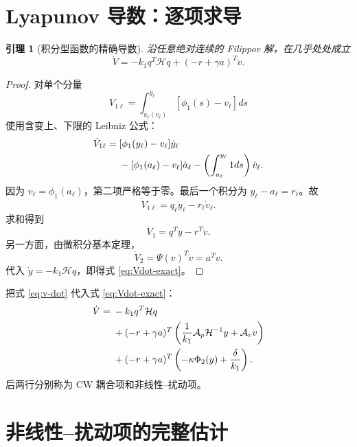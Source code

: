 \documentclass[UTF8,a4paper,12pt]{ctexart}
\newtheorem{lemma}{引理}
\newcommand{\cH}{\mathcal H}
\newcommand{\Ap}{\mathcal A_p}
\newcommand{\Av}{\mathcal A_v}
\begin{document}
\section{Lyapunov 导数：逐项求导}

\begin{lemma}[积分型函数的精确导数]
沿任意绝对连续的 Filippov 解，在几乎处处成立
\begin{equation}
 \dot V=-k_1q^T\cH q+(-r+\gamma a)^T\dot v.
\label{eq:Vdot-exact}
\end{equation}
\end{lemma}

\begin{proof}
对单个分量
\begin{equation}
 V_{1\ell}=\int_{a_\ell(v_\ell)}^{y_\ell}
 [\phi_1(s)-v_\ell]ds
\end{equation}
使用含变上、下限的 Leibniz 公式：
\begin{align}
 \dot V_{1\ell}
 ={}&[\phi_1(y_\ell)-v_\ell]\dot y_\ell\notag\\
 &-[\phi_1(a_\ell)-v_\ell]\dot a_\ell
 -\left(\int_{a_\ell}^{y_\ell}1ds\right)\dot v_\ell.
\end{align}
因为 $v_\ell=\phi_1(a_\ell)$，第二项严格等于零。最后一个积分为 $y_\ell-a_\ell=r_\ell$。故
\begin{equation}
 \dot V_{1\ell}=q_\ell\dot y_\ell-r_\ell\dot v_\ell.
\end{equation}
求和得到
\begin{equation}
 \dot V_1=q^T\dot y-r^T\dot v.
\end{equation}
另一方面，由微积分基本定理，
\begin{equation}
 \dot V_2=\Psi(v)^T\dot v=a^T\dot v.
\end{equation}
代入 $\dot y=-k_1\cH q$，即得式 \eqref{eq:Vdot-exact}。
\end{proof}

把式 \eqref{eq:v-dot} 代入式 \eqref{eq:Vdot-exact}：
\begin{align}
 \dot V={}&-k_1q^T\cH q\notag\\
 &+(-r+\gamma a)^T
 \left(\frac1{k_1}\Ap\cH^{-1}y+\Av v\right)\notag\\
 &+(-r+\gamma a)^T
 \left(-\kappa\Phi_2(y)+\frac{\delta}{k_1}\right).
\label{eq:Vdot-split}
\end{align}
后两行分别称为 CW 耦合项和非线性--扰动项。

\section{非线性--扰动项的完整估计}
\end{document}
